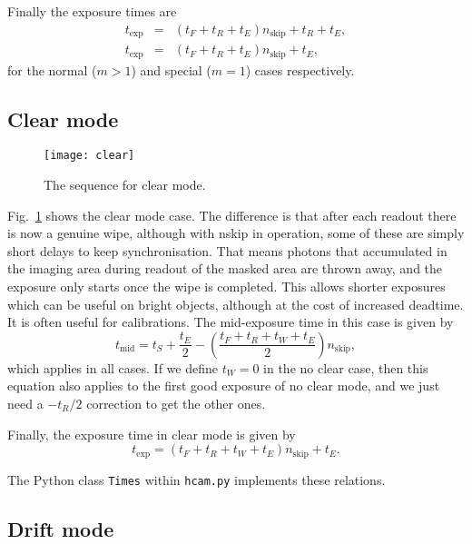 \documentclass[12pt,a4paper]{article}
\begin{document}
Finally the exposure times are
\begin{eqnarray}
t_{\mathrm{exp}} &=& (t_F + t_R + t_E) n_{\mathrm{skip}} + t_R + t_E,\\
t_{\mathrm{exp}} &=& (t_F + t_R + t_E) n_{\mathrm{skip}} + t_E,
\end{eqnarray}
for the normal ($m > 1$) and special ($m = 1$) cases respectively.

\subsection{Clear mode}

\begin{figure}
\begin{center}
\texttt{[image: clear]}
\end{center}
\caption{\label{clear} The sequence for clear mode.}
\end{figure}

Fig.~\ref{clear} shows the clear mode case. The difference is that after each
readout there is now a genuine wipe, although with nskip in operation, some of
these are simply short delays to keep synchronisation. That means photons that
accumulated in the imaging area during readout of the masked area are thrown
away, and the exposure only starts once the wipe is completed. This allows
shorter exposures which can be useful on bright objects, although at the cost
of increased deadtime. It is often useful for calibrations. The mid-exposure 
time in this case is given by
\begin{equation}
t_{\mathrm{mid}} = t_S + \frac{t_E}{2} -
\left(\frac{t_F + t_R + t_W + t_E}{2}\right) n_{\mathrm{skip}} ,
\end{equation}
which applies in all cases.
If we define $t_W = 0$ in the no clear case, then this equation also applies
to the first good exposure of no clear mode, and we just need a $-t_R/2$
correction to get the other ones.

Finally, the exposure time in clear mode is given by
\begin{equation}
 t_{\mathrm{exp}} = (t_F + t_R + t_W + t_E) n_{\mathrm{skip}} + t_E.
\end{equation}

The Python class {\tt Times} within {\tt hcam.py} implements these relations.

\subsection{Drift mode}
\end{document}
